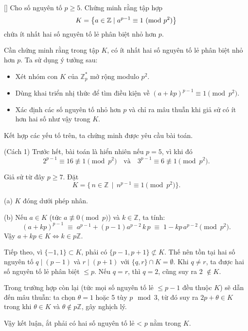 \documentclass[../05-modular-arithmetic-a.tex]{subfiles}
\begin{document}
\begin{example*}\label{example:FRA-2015-RMM-P3}[\textbf{}]
	Cho số nguyên tố \( p \geq 5 \). Chứng minh rằng tập hợp
	\[
		K = \left\{ a \in \mathbb{Z} \mid a^{p-1} \equiv 1 \ (\mathrm{mod}\ p^2) \right\}
	\]
	chứa ít nhất hai số nguyên tố lẻ phân biệt nhỏ hơn \( p \).
\end{example*}

\begin{story*}
    Cần chứng minh rằng trong tập \( K \), có ít nhất hai số nguyên tố lẻ phân biệt nhỏ hơn \( p \).  
    Ta sử dụng ý tưởng sau:
    \begin{itemize}[topsep=0pt, partopsep=0pt, itemsep=0pt]
        \item Xét nhóm con \( K \) của \( \mathbb{Z}_p^* \) mở rộng modulo \( p^2 \).
        \item Dùng khai triển nhị thức để tìm điều kiện về \( (a + kp)^{p-1} \equiv 1 \pmod{p^2} \).
        \item Xác định các số nguyên tố nhỏ hơn \( p \) và chỉ ra mâu thuẫn khi giả sử có ít hơn hai số như vậy trong \( K \).
    \end{itemize}
    Kết hợp các yếu tố trên, ta chứng minh được yêu cầu bài toán.
\end{story*}

\bigbreak

\begin{soln}(Cách 1)\footnotemark
	Trước hết, bài toán là hiển nhiên nếu \( p = 5 \), vì khi đó
	\[
		2^{p-1} \equiv 16 \not\equiv 1 \pmod{p^2}
		\quad\text{và}\quad
		3^{p-1} \equiv 6 \not\equiv 1 \pmod{p^2}.
	\]  
	
	Giả sử từ đây \( p \geq 7 \). Đặt 
	\[
		K = \{\,n\in \mathbb{Z}\,\mid\,n^{p-1}\equiv 1 \pmod{p^2}\}.
	\]
	
	(a) \(K\) đóng dưới phép nhân.  
	
	(b) Nếu \(a\in K\) (tức \(a\not\equiv0\pmod{p}\)) và \(k\in\mathbb{Z}\), ta tính:
	\[
		(a + kp)^{p-1} \;\equiv\; a^{p-1} + (p-1)a^{p-2}\,k\,p \;\equiv\;1 - kp\,a^{p-2}\pmod{p^2}.
	\]
	Vậy \(a+kp\in K\iff k\in p\mathbb{Z}\).  

	Tiếp theo, vì \(\{-1,1\}\subset K\), phải có \(\{p-1,p+1\}\not\subset K\).
	Thế nên tồn tại hai số nguyên tố \(q \mid (p-1)\) và \(r \mid (p+1)\) với \(\{q,r\}\cap K=\emptyset\).
	Khi \(q\ne r\), ta được hai số nguyên tố lẻ phân biệt \(\le p\). Nếu \(q=r\), thì \(q=2\), cũng suy ra 2 \(\notin K\).  

	Trong trường hợp còn lại (tức mọi số nguyên tố lẻ \(\le p-1\) đều thuộc \(K\)) sẽ dẫn đến mâu thuẫn:
	ta chọn \(\theta=1\) hoặc 5 tùy \(p\mod3\), từ đó suy ra \(2p+\theta\in K\) trong khi \(\theta\in K\) và \(\theta\notin p\mathbb{Z}\), gây nghịch lý.  

	Vậy kết luận, ắt phải có hai số nguyên tố lẻ < \(p\) nằm trong \(K\).  
\end{soln}

\end{document}
